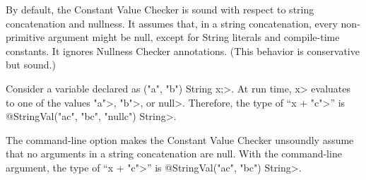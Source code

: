 
By default, the Constant Value Checker is sound with respect to string
concatenation and nullness.  It assumes that, in a string concatenation,
every non-primitive argument might be null, except for String literals
and compile-time constants. It ignores Nullness Checker annotations.
(This behavior is conservative but sound.)

Consider a variable declared as
\<("a", "b") String x;>.
At run time, \<x> evaluates to one of the values \<"a">, \<"b">, or
\<null>.
Therefore, the type of ``\<x + "c">'' is
\<@StringVal("ac", "bc", "nullc") String>.

The  command-line option makes the
Constant Value Checker unsoundly assume that no arguments in a string
concatenation are null.
With the command-line argument, the type of ``\<x + "c">'' is
\<@StringVal("ac", "bc") String>.

